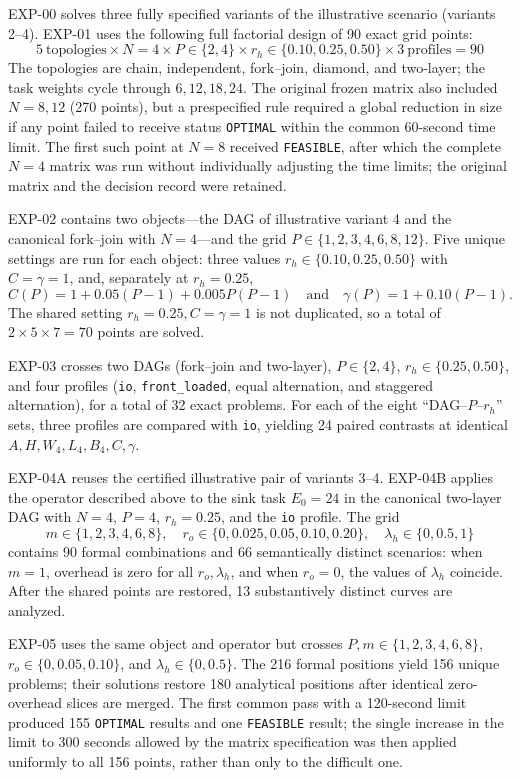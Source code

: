 EXP-00 solves three fully specified variants of the illustrative scenario
(variants 2--4). EXP-01 uses the following full factorial design of 90 exact
grid points:
\[
  5\ \text{topologies}\times N{=}4\times
  P\in\{2,4\}\times r_h\in\{0.10,0.25,0.50\}\times
  3\ \text{profiles}=90
\]
The topologies are chain, independent, fork--join,
diamond, and two-layer; the task weights cycle through $6,12,18,24$. The
original frozen matrix also included $N=8,12$ (270 points), but a prespecified
rule required a global reduction in size if any point failed to receive status
\texttt{OPTIMAL} within the common 60-second time limit. The first such point at
$N=8$ received \texttt{FEASIBLE}, after which the complete $N=4$ matrix was run
without individually adjusting the time limits; the original matrix and the
decision record were retained.

EXP-02 contains two objects---the DAG of illustrative variant 4 and the
canonical fork--join with $N=4$---and the grid
$P\in\{1,2,3,4,6,8,12\}$. Five unique settings are run for each object: three
values $r_h\in\{0.10,0.25,0.50\}$ with $C=\gamma=1$, and, separately at
$r_h=0.25$,
\[
 C(P)=1+0.05(P-1)+0.005P(P-1)
 \quad\text{and}\quad
 \gamma(P)=1+0.10(P-1).
\]
The shared setting $r_h=0.25,C=\gamma=1$ is not duplicated, so a total of
$2\times5\times7=70$ points are solved.

EXP-03 crosses two DAGs (fork--join and two-layer),
$P\in\{2,4\}$, $r_h\in\{0.25,0.50\}$, and four profiles
(\texttt{io}, \texttt{front\_loaded}, equal alternation, and staggered
alternation), for a total of 32 exact problems. For each of the eight
``DAG--$P$--$r_h$'' sets, three profiles are compared with \texttt{io}, yielding
24 paired contrasts at identical $A,H,W_4,L_4,B_4,C,\gamma$.

EXP-04A reuses the certified illustrative pair of variants 3--4. EXP-04B applies
the operator described above to the sink task $E_0=24$ in the canonical
two-layer DAG with $N=4$, $P=4$, $r_h=0.25$, and the \texttt{io} profile. The grid
\[
 m\in\{1,2,3,4,6,8\},\quad
 r_o\in\{0,0.025,0.05,0.10,0.20\},\quad
 \lambda_h\in\{0,0.5,1\}
\]
contains 90 formal combinations and 66 semantically distinct scenarios: when
$m=1$, overhead is zero for all $r_o,\lambda_h$, and when $r_o=0$, the values of
$\lambda_h$ coincide. After the shared points are restored, 13 substantively
distinct curves are analyzed.

EXP-05 uses the same object and operator but crosses
$P,m\in\{1,2,3,4,6,8\}$, $r_o\in\{0,0.05,0.10\}$, and
$\lambda_h\in\{0,0.5\}$. The 216 formal positions yield 156 unique problems;
their solutions restore 180 analytical positions after identical zero-overhead
slices are merged. The first common pass with a 120-second limit produced 155
\texttt{OPTIMAL} results and one \texttt{FEASIBLE} result; the single increase
in the limit to 300 seconds allowed by the matrix specification was then applied
uniformly to all 156 points, rather than only to the difficult one.
